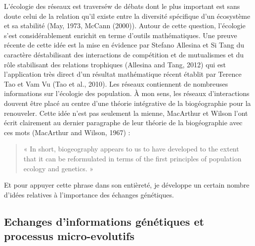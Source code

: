 L'écologie des réseaux est traverséw de débats dont le plus important
est sans doute celui de la relation qu'il existe entre la diversité
spécifique d'un écosystème et sa stabilité (May, 1973, McCann (2000)).
Autour de cette question, l'écologie s'est considérablement enrichit en
terme d'outils mathématiques. Une preuve récente de cette idée est la
mise en évidence par Stefano Allesina et Si Tang du caractère
déstabilisant des interactions de compétition et de mutualismes et du
rôle stabilisant des relations trophiques (Allesina and Tang, 2012) qui
est l'application très direct d'un résultat mathématique récent établit
par Terence Tao et Vam Vu (Tao et al., 2010). Les réseaux contiennent de
nombreuses informations sur l'écologie des population. À mon sens, les
réseaux d'interactions douvent être placé au centre d'une théorie
intégrative de la biogéographie pour la renouveler. Cette idée n'est pas
seulement la mienne, MacArthur et Wilson l'ont écrit clairement au
dernier paragraphe de leur théorie de la biogéographie avec ces mots
(MacArthur and Wilson, 1967) :

\begin{quote}
« In short, biogeography appears to us to have developed to the extent
that it can be reformulated in terms of the first principles of
population ecology and genetics. »
\end{quote}

Et pour appuyer cette phrase dans son entièreté, je développe un certain
nombre d'idées relatives à l'importance des échanges génétiques.

\subsection*{Echanges d'informations génétiques et processus
micro-evolutifs}\label{echanges-dinformations-guxe9nuxe9tiques-et-processus-micro-evolutifs}

